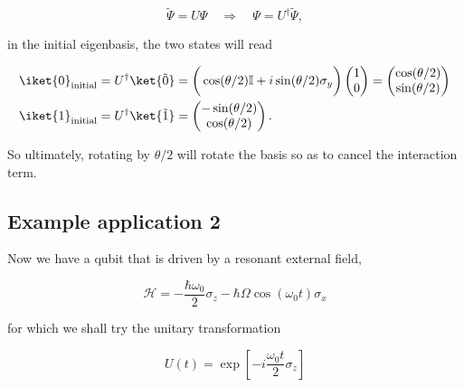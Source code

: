   \begin{equation}\label{uniTransform}
    \tilde{\Psi} = U\Psi \quad\Rightarrow\quad \Psi = U^{\dagger}\tilde{\Psi},
  \end{equation}

  \noindent in the initial eigenbasis, the two states will read

  \begin{equation}\label{uniInitial}
    \begin{aligned}
      \iket{0}_{\text{initial}}     &    =     U^{\dagger}\ket{\tilde{0}}    =
      \bigg(\cos(\theta/2)\mathbb{I}+i\sin(\theta/2)\sigma_y\bigg)\begin{pmatrix}
        1\\0
      \end{pmatrix} = \begin{pmatrix} \cos(\theta/2)\\\sin(\theta/2)
      \end{pmatrix} \\
      \iket{1}_{\text{initial}}      &       =      U^{\dagger}\ket{\tilde{1}}
      = \begin{pmatrix} -\sin(\theta/2)\\\cos(\theta/2)
      \end{pmatrix}.
    \end{aligned}
  \end{equation}


  \noindent  So ultimately,  rotating by  $ \theta/2  $ will  rotate the
  basis so as to cancel the interaction term.

 \subsection{Example application 2\label{subsec:Rabi}}
 Now  we have  a qubit  that  is driven  by a  resonant external  field,

  \begin{equation}\label{app2}
    \mathcal{H} = -\frac{\hbar\omega_0}{2}\sigma_z-\hbar\Omega\cos(\omega_0 t)\sigma_x
  \end{equation}

  \noindent for which we shall try the unitary transformation

  \begin{equation}\label{app2Try}
    U(t) = \exp\left[-i\frac{\omega_0 t}{2}\sigma_z\right]
  \end{equation}


